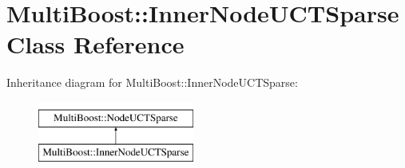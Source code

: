 \hypertarget{classMultiBoost_1_1InnerNodeUCTSparse}{\section{Multi\-Boost\-:\-:Inner\-Node\-U\-C\-T\-Sparse Class Reference}
\label{classMultiBoost_1_1InnerNodeUCTSparse}
}
Inheritance diagram for Multi\-Boost\-:\-:Inner\-Node\-U\-C\-T\-Sparse\-:\begin{figure}[H]
\begin{center}
\leavevmode
\includegraphics[height=2.000000cm]{classMultiBoost_1_1InnerNodeUCTSparse}
\end{center}
\end{figure}

